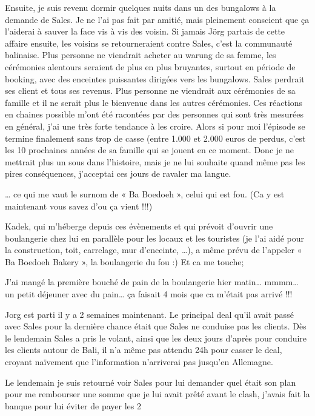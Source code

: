 \begin{multicols}{2}
Ensuite, je suis revenu dormir quelques nuits dans un des bungalows à la demande de Sales. Je ne l’ai pas fait par amitié, mais pleinement conscient que ça l’aiderai à sauver la face vis à vis des voisin. Si jamais Jörg partais de cette affaire ensuite, les voisins se retourneraient contre Sales, c’est la communauté balinaise. Plus personne ne viendrait acheter au warung de sa femme, les cérémonies alentours seraient de plus en plus bruyantes, surtout en période de booking, avec des enceintes puissantes dirigées vers les bungalows. Sales perdrait ses client et tous ses revenus. Plus personne ne viendrait aux cérémonies de sa famille et il ne serait plus le bienvenue dans les autres cérémonies. Ces réactions en chaines possible m’ont été racontées par des personnes qui sont très mesurées en général, j’ai une très forte tendance à les croire. Alors si pour moi l’épisode se termine finalement sans trop de casse (entre 1.000 et 2.000 euros de perdus, c’est les 10 prochaines années de sa famille qui se jouent en ce moment. Donc je ne mettrait plus un sous dans l’histoire, mais je ne lui souhaite quand même pas les pires conséquences, j’acceptai ces jours de ravaler ma langue.

… ce qui me vaut le surnom de « Ba Boedoeh », celui qui est fou. (Ca y est maintenant vous savez d’ou ça vient !!!)

Kadek, qui m’héberge depuis ces évènements et qui prévoit d’ouvrir une boulangerie chez lui en parallèle pour les locaux et les touristes (je l’ai aidé pour la construction, toit, carrelage, mur d’enceinte, …), a même prévu de l’appeler « Ba Boedoeh Bakery », la boulangerie du fou :) Et ca me touche;

J’ai mangé la première bouché de pain de la boulangerie hier matin… mmmm… un petit déjeuner avec du pain… ça faisait 4 mois que ca m’était pas arrivé !!!

Jorg est parti il y a 2 semaines maintenant. Le principal deal qu’il avait passé avec Sales pour la dernière chance était que Sales ne conduise pas les clients. Dès le lendemain Sales a pris le volant, ainsi que les deux jours d’après pour conduire les clients autour de Bali, il n’a même pas attendu 24h pour casser le deal, croyant naïvement que l’information n’arriverai pas jusqu’en Allemagne.

Le lendemain je suis retourné voir Sales pour lui demander quel était son plan pour me rembourser une somme que je lui avait prêté avant le clash, j’avais fait la banque pour lui éviter de payer les 2%


\end{multicols}

